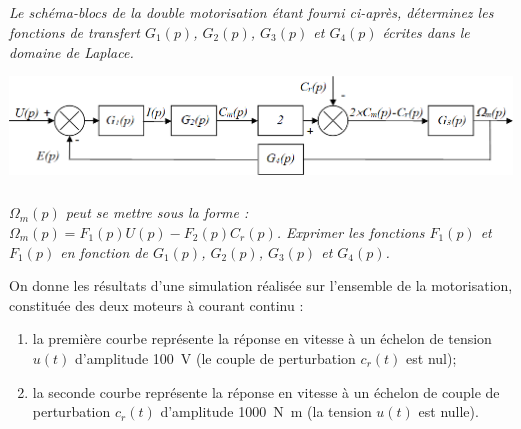 \documentclass[10pt,fleqn]{article} %
\begin{document}
\subparagraph{}
\textit{Le schéma-blocs de la double motorisation étant fourni ci-après, déterminez les fonctions de transfert $G_1(p)$, $G_2(p)$, $G_3(p)$ et $G_4(p)$ écrites dans le domaine de Laplace.}

\begin{center}
	\includegraphics[width=\linewidth]{images2/fig_02}
\end{center}

\subparagraph{}
\textit{$\Omega_m(p)$ peut se mettre sous la forme :  $\Omega_m(p)=F_1(p)U(p)-F_2(p)C_r(p)$. Exprimer les fonctions $F_1(p)$ et $F_1(p)$ en fonction de $G_1(p)$, $G_2(p)$, $G_3(p)$ et $G_4(p)$.}


On donne les résultats d’une simulation réalisée sur l’ensemble de la motorisation, constituée des deux moteurs à courant continu :
\begin{enumerate}
\item la première courbe représente la réponse en vitesse à un échelon de tension $u(t)$ d’amplitude \SI{100}{V} (le couple de perturbation $c_r(t)$ est nul);
\item la seconde courbe représente la réponse en vitesse à un échelon de couple de perturbation $c_r(t)$ d’amplitude \SI{1000}{N.m} (la tension $u(t)$ est nulle).
\end{enumerate}
\end{document}
